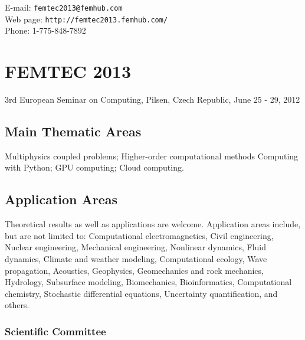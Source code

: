 \documentclass[article,A4,11pt]{llncs}%
\begin{document}
\noindent
E-mail: {\tt femtec2013@femhub.com}\\
Web page: {\tt http://femtec2013.femhub.com/}\\
Phone: 1-775-848-7892

\chapter*{\huge FEMTEC 2013}
\vspace{-5mm}
\normalsize
\begin{center}
3rd European Seminar on Computing,
Pilsen, Czech Republic,
June 25 - 29, 2012
\end{center}
\vspace{-3mm}

\section*{Main Thematic Areas}%

Multiphysics coupled problems; Higher-order computational methods
Computing with Python; GPU computing; Cloud computing.

\section*{Application Areas}%

Theoretical results as well as applications are welcome. Application areas include, but are not limited to: Computational electromagnetics, Civil engineering, Nuclear engineering, Mechanical engineering, Nonlinear dynamics, Fluid dynamics, Climate and weather modeling, Computational ecology, Wave propagation, Acoustics, Geophysics, Geomechanics and rock mechanics, Hydrology, Subsurface modeling, Biomechanics, Bioinformatics, Computational chemistry, Stochastic differential equations, Uncertainty quantification, and others.

\subsection*{Scientific Committee}%

\end{document}
